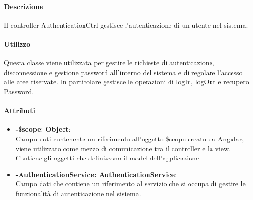\paragraph{Descrizione}
Il controller AuthenticationCtrl gestisce l'autenticazione di un utente nel sistema.

\paragraph{Utilizzo}
Questa classe viene utilizzata per gestire le richieste di autenticazione, disconnessione e gestione password all'interno del sistema e di regolare l'accesso alle aree riservate.
In particolare gestisce le operazioni di logIn, logOut e recupero Password.
\paragraph{Attributi}
\begin{itemize}
	\item \textbf{-\$scope: Object}:\\
	Campo dati contenente un riferimento all'oggetto \$scope creato da Angular, viene utilizzato come mezzo di comunicazione tra il controller e la view. Contiene gli oggetti che definiscono il model dell'applicazione.
	\item \textbf{-AuthenticationService: AuthenticationService}:\\
	Campo dati che contiene un riferimento al servizio che si occupa di gestire le funzionalità di autenticazione nel sistema.
\end{itemize}


